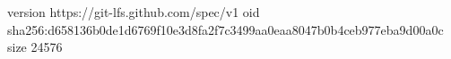 version https://git-lfs.github.com/spec/v1
oid sha256:d658136b0de1d6769f10e3d8fa2f7c3499aa0eaa8047b0b4ceb977eba9d00a0c
size 24576

